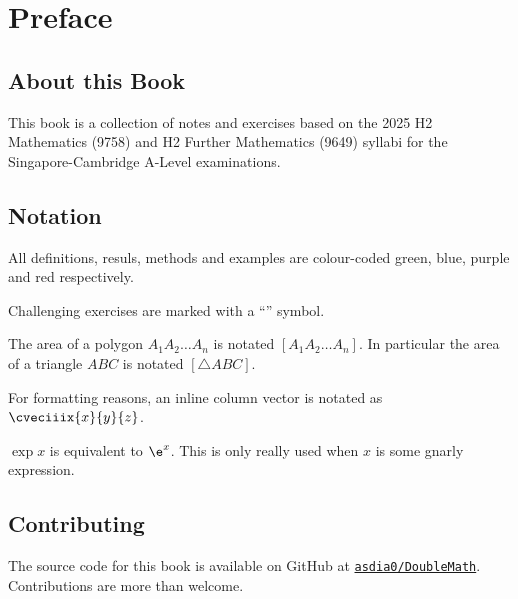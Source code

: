 \chapter*{Preface}

\section*{About this Book}

This book is a collection of notes and exercises based on the 2025 H2 Mathematics (9758) and H2 Further Mathematics (9649) syllabi for the Singapore-Cambridge A-Level examinations.

\section*{Notation}

All definitions, resuls, methods and examples are colour-coded green, blue, purple and red respectively. 

Challenging exercises are marked with a ``\chili'' symbol.

The area of a polygon $A_1 A_2 \dots A_n$ is notated $[A_1 A_2 \dots A_n]$. In particular the area of a triangle $ABC$ is notated $[\triangle ABC]$.

For formatting reasons, an inline column vector is notated as $\cveciiix{x}{y}{z}$.

$\exp x$ is equivalent to $\e^{x}$. This is only really used when $x$ is some gnarly expression.

\section*{Contributing}

The source code for this book is available on GitHub at \href{https://github.com/asdia0/DoubleMath}{\texttt{asdia0/DoubleMath}}. Contributions are more than welcome.